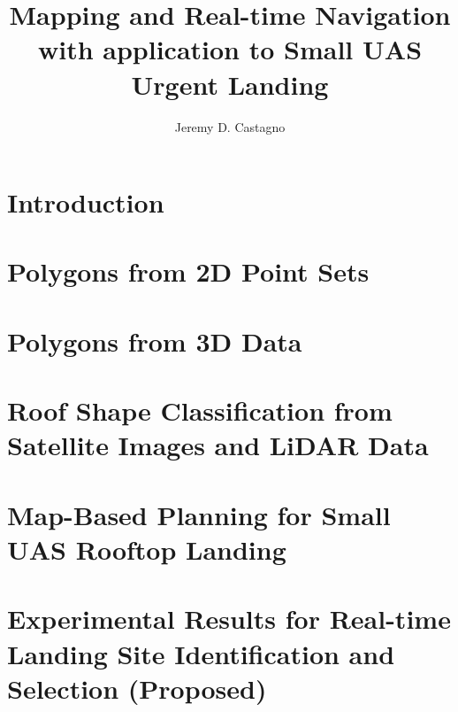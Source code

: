 \documentclass[thesis]{./style/thesis-umich}
\title{Mapping and Real-time Navigation \\ with application to Small UAS Urgent Landing}
\author{Jeremy D. Castagno}
\theoremstyle{remark}
\begin{document}

\chapter{Introduction}
 \label{ch:introduction}
 

 
\chapter{Polygons from 2D Point Sets}
 \label{ch:polylidar}
 
 
 
\chapter{Polygons from 3D Data}
 \label{ch:polylidar3d}
 
 
 
\chapter{Roof Shape Classification from Satellite Images and LiDAR Data  }
 \label{ch:roofshape}
 
 
\chapter{Map-Based Planning for Small UAS Rooftop Landing }
 \label{ch:maplanding}
 
 
\chapter{Experimental Results for Real-time Landing Site Identification and Selection (Proposed)}
 \label{ch:experiments}
 


%  








\end{document}
